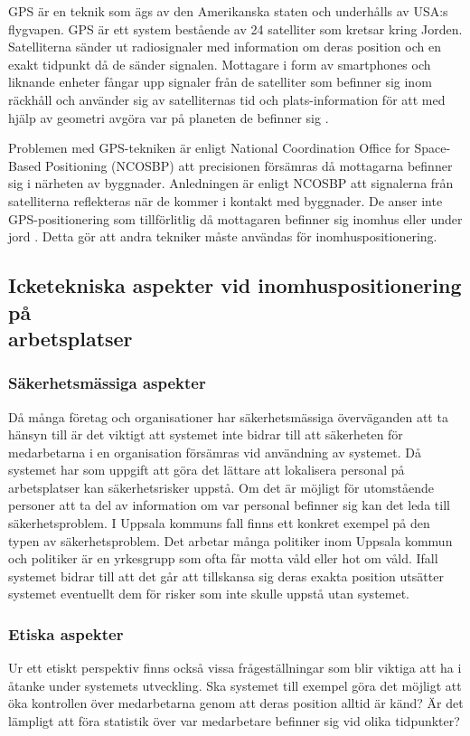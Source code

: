 \documentclass[a4paper,12pt]{article}
\begin{document}
 GPS är en teknik som ägs av den Amerikanska staten och underhålls av USA:s flygvapen\cite{GPS_US_HOW}. GPS är ett system bestående av 24 satelliter som kretsar kring Jorden. Satelliterna sänder ut radiosignaler med information om deras position och en exakt tidpunkt då de sänder signalen. Mottagare i form av smartphones och liknande enheter fångar upp signaler från de satelliter som befinner sig inom räckhåll och använder sig av satelliternas tid och plats-information för att med hjälp av geometri avgöra var på planeten de befinner sig \cite{GPS_US_HOW}.

 Problemen med GPS-tekniken är enligt National Coordination Office for Space-Based Positioning (NCOSBP) att precisionen försämras då mottagarna befinner sig i närheten av byggnader. Anledningen är enligt NCOSBP att signalerna från satelliterna reflekteras när de kommer i kontakt med byggnader. De anser inte GPS-positionering som tillförlitlig då mottagaren befinner sig inomhus eller under jord \cite{GPS_US_ACCURACY}. Detta gör att andra tekniker måste användas för inomhuspositionering.

 \subsection{Icketekniska aspekter vid inomhuspositionering på \\arbetsplatser}\label{icketekniska_aspekter}

 \subsubsection{Säkerhetsmässiga aspekter}
 Då många företag och organisationer har säkerhetsmässiga överväganden att ta hänsyn till är det viktigt att systemet inte bidrar till att säkerheten för medarbetarna i en organisation försämras vid användning av systemet.
 Då systemet har som uppgift att göra det lättare att lokalisera personal på arbetsplatser kan säkerhetsrisker uppstå. Om det är möjligt för utomstående personer att ta del av information om var personal befinner sig kan det leda till säkerhetsproblem. I Uppsala kommuns fall finns ett konkret exempel på den typen av säkerhetsproblem. Det arbetar många politiker inom Uppsala kommun och politiker är en yrkesgrupp som ofta får motta våld eller hot om våld. Ifall systemet bidrar till att det går att tillskansa sig deras exakta position utsätter systemet eventuellt dem för risker som inte skulle uppstå utan systemet.

 \subsubsection{Etiska aspekter}
 Ur ett etiskt perspektiv finns också vissa frågeställningar som blir viktiga att ha i åtanke under systemets utveckling. Ska systemet till exempel göra det möjligt att öka kontrollen över medarbetarna genom att deras position alltid är känd? Är det lämpligt att föra statistik över var medarbetare befinner sig vid olika tidpunkter?
\end{document}
